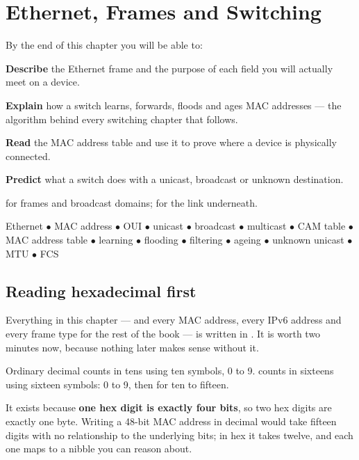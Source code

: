 \chapter{Ethernet, Frames and Switching}\label{ch:ethernet}

\begin{outcomes}
By the end of this chapter you will be able to:
\begin{tight}
  \item \textbf{Describe} the Ethernet frame and the purpose of each field you
        will actually meet on a device.
  \item \textbf{Explain} how a switch learns, forwards, floods and ages MAC
        addresses --- the algorithm behind every switching chapter that follows.
  \item \textbf{Read} the MAC address table and use it to prove where a device is
        physically connected.
  \item \textbf{Predict} what a switch does with a unicast, broadcast or unknown
        destination.
\end{tight}
\end{outcomes}

\begin{prereq}
 for frames and broadcast domains;  for the link
underneath.
\end{prereq}

\begin{keyterms}
Ethernet $\bullet$ MAC address $\bullet$ OUI $\bullet$ unicast $\bullet$
broadcast $\bullet$ multicast $\bullet$ CAM table $\bullet$ MAC address table
$\bullet$ learning $\bullet$ flooding $\bullet$ filtering $\bullet$ ageing
$\bullet$ unknown unicast $\bullet$ MTU $\bullet$ FCS
\end{keyterms}

\section{Reading hexadecimal first}

Everything in this chapter --- and every MAC address, every IPv6 address and
every frame type for the rest of the book --- is written in .
It is worth two minutes now, because nothing later makes sense without it.

\begin{definitionbox}
Ordinary decimal counts in tens using ten symbols, 0 to 9.  counts in
sixteens using sixteen symbols: 0 to 9, then  for ten to
fifteen.

It exists because \textbf{one hex digit is exactly four bits}, so two hex digits
are exactly one byte. Writing a 48-bit MAC address in decimal would take
fifteen digits with no relationship to the underlying bits; in hex it takes
twelve, and each one maps to a nibble you can reason about.
\end{definitionbox}

